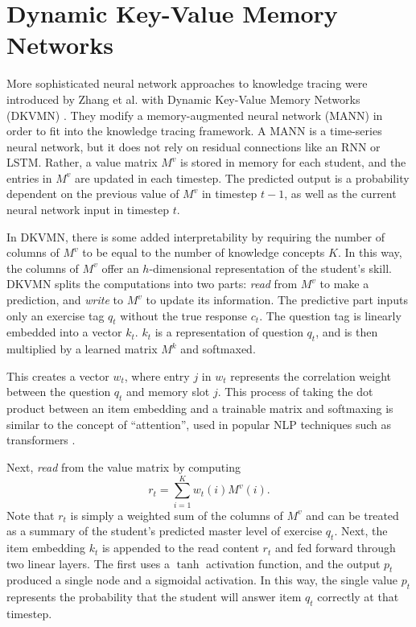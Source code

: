   \section{Dynamic Key-Value Memory Networks}\label{sec:dkvmn}
More sophisticated neural network approaches to knowledge tracing were introduced by Zhang et al. with Dynamic Key-Value Memory Networks (DKVMN) \cite{zhang2017}. They modify a memory-augmented neural network (MANN) in order to fit into the knowledge tracing framework. A MANN is a time-series neural network, but it does not rely on residual connections like an RNN or LSTM. Rather, a value matrix $M^v$ is stored in memory for each student, and the entries in $M^v$ are updated in each timestep. The predicted output is a probability dependent on the previous value of $M^v$ in timestep $t-1$, as well as the current neural network input in timestep $t$.

In DKVMN, there is some added interpretability by requiring the number of columns of $M^v$ to be equal to the number of knowledge concepts $K$. In this way, the columns of $M^v$ offer an $h$-dimensional representation of the student's skill. DKVMN splits the computations into two parts: \textit{read} from $M^v$ to make a prediction, and \textit{write} to $M^v$ to update its information. The predictive part inputs only an exercise tag $q_t$ without the true response $c_t$. The question tag is linearly embedded into a vector $k_t$. $k_t$ is a representation of question $q_t$, and is then multiplied by a learned matrix $M^k$ and softmaxed. 

This creates a vector $w_t$, where entry $j$ in $w_t$ represents the correlation weight between the question $q_t$ and memory slot $j$. This process of taking the dot product between an item embedding and a trainable matrix and softmaxing is similar to the concept of ``attention'', used in popular NLP techniques such as transformers \cite{vaswani2017}.

Next, \textit{read} from the value matrix by computing 
\begin{equation}
  r_t = \sum_{i=1}^K w_t(i) M^v(i).
  \label{eq:dkvmn_read}
\end{equation}
Note that $r_t$ is simply a weighted sum of the columns of $M^v$ and can be treated as a summary of the student's predicted master level of exercise $q_t$. Next, the item embedding $k_t$ is appended to the read content $r_t$ and fed forward through two linear layers. The first uses a $\tanh$ activation function, and the output $p_t$ produced a single node and a sigmoidal activation. In this way, the single value $p_t$ represents the probability that the student will answer item $q_t$ correctly at that timestep.

